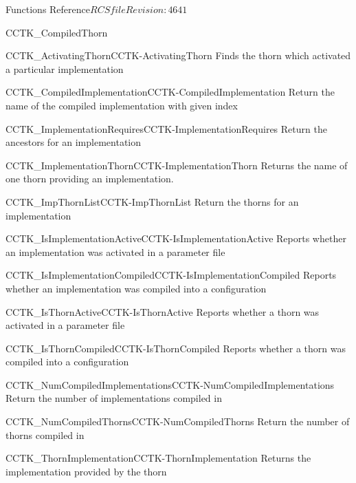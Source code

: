 \begin{cactuspart}{ Functions Reference}{$RCSfile$}{$Revision: 4641 $}
\begin{FunctionDescription}{CCTK\_CompiledThorn}
\begin{SeeAlsoSection}
\begin{SeeAlso2}{CCTK\_ActivatingThorn}{CCTK-ActivatingThorn}
  Finds the thorn which activated a particular implementation
\end{SeeAlso2}
\begin{SeeAlso2}{CCTK\_CompiledImplementation}{CCTK-CompiledImplementation}
  Return the name of the compiled implementation with given index
\end{SeeAlso2}
\begin{SeeAlso2}{CCTK\_ImplementationRequires}{CCTK-ImplementationRequires}
  Return the ancestors for an implementation
\end{SeeAlso2}
\begin{SeeAlso2}{CCTK\_ImplementationThorn}{CCTK-ImplementationThorn}
  Returns the name of one thorn providing an implementation.
\end{SeeAlso2}
\begin{SeeAlso2}{CCTK\_ImpThornList}{CCTK-ImpThornList}
  Return the thorns for an implementation
\end{SeeAlso2}
\begin{SeeAlso2}{CCTK\_IsImplementationActive}{CCTK-IsImplementationActive}
  Reports whether an implementation was activated in a parameter file
\end{SeeAlso2}
\begin{SeeAlso2}{CCTK\_IsImplementationCompiled}{CCTK-IsImplementationCompiled}
  Reports whether an implementation was compiled into a configuration
\end{SeeAlso2}
\begin{SeeAlso2}{CCTK\_IsThornActive}{CCTK-IsThornActive}
  Reports whether a thorn was activated in a parameter file
\end{SeeAlso2}
\begin{SeeAlso2}{CCTK\_IsThornCompiled}{CCTK-IsThornCompiled}
  Reports whether a thorn was compiled into a configuration
\end{SeeAlso2}
\begin{SeeAlso2}{CCTK\_NumCompiledImplementations}{CCTK-NumCompiledImplementations}
  Return the number of implementations compiled in
\end{SeeAlso2}
\begin{SeeAlso2}{CCTK\_NumCompiledThorns}{CCTK-NumCompiledThorns}
  Return the number of thorns compiled in
\end{SeeAlso2}
\begin{SeeAlso2}{CCTK\_ThornImplementation}{CCTK-ThornImplementation}
  Returns the implementation provided by the thorn
\end{SeeAlso2}
\end{SeeAlsoSection}


\end{FunctionDescription}
\end{cactuspart}
